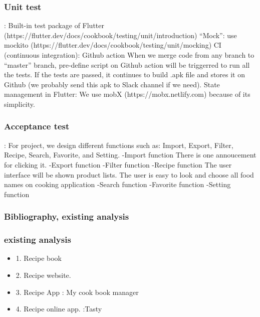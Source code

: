 \documentclass{article}
\begin{document}
\subsubsection{Unit test}:
Built-in test package of Flutter (https://flutter.dev/docs/cookbook/testing/unit/introduction)
“Mock”: use mockito (https://flutter.dev/docs/cookbook/testing/unit/mocking)
CI (continuous integration): Github action
When we merge code from any branch to “master” branch, pre-define script on Github action will be triggerred to run all the tests. If the tests are passed, it continues to build .apk file and stores it on Github (we probably send this apk to Slack channel if we need).
State management in Flutter: We use mobX (https://mobx.netlify.com) because of its simplicity.\\
\subsubsection{Acceptance test}:
For project, we design different functions such as: Import, Export, Filter, Recipe, Search, Favorite, and Setting.
-Import function
There is one annoucement for clicking it. 
-Export function
-Filter function
-Recipe function
The user interface will be shown product lists. The user is easy to look and choose all food names on cooking application
-Search function
-Favorite function
-Setting function



\subsubsection{ Bibliography, existing analysis }
\subsubsection{existing analysis}

\begin{itemize}
\item 1. Recipe book
\item 2. Recipe website.
\item 3. Recipe App : My cook book manager
\item 4. Recipe online app. :Tasty
\end{itemize}
\end{document}
